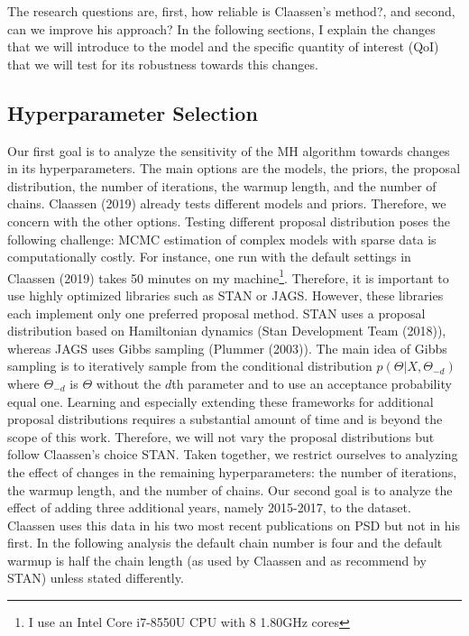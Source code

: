 \documentclass[12pt,english,a4paper,oneside]{article}
\theoremstyle{definition}
\theoremstyle{definition}
\theoremstyle{definition}
\theoremstyle{definition}
\theoremstyle{remark}
\begin{document}
The research questions are, first, how reliable is Claassen's method?, and second, can we improve his approach? In the following sections, I explain the changes that we will introduce to the model and the specific quantity of interest (QoI) that we will test for its robustness towards this changes.

\hypertarget{hyperparameter-selection}{%
\subsection{Hyperparameter Selection}\label{hyperparameter-selection}}

Our first goal is to analyze the sensitivity of the MH algorithm towards changes in its hyperparameters. The main options are the models, the priors, the proposal distribution, the number of iterations, the warmup length, and the number of chains. Claassen (2019) already tests different models and priors. Therefore, we concern with the other options. Testing different proposal distribution poses the following challenge: MCMC estimation of complex models with sparse data is computationally costly. For instance, one run with the default settings in Claassen (2019) takes 50 minutes on my machine\footnote{I use an Intel Core i7-8550U CPU with 8 1.80GHz cores}. Therefore, it is important to use highly optimized libraries such as STAN or JAGS. However, these libraries each implement only one preferred proposal method. STAN uses a proposal distribution based on Hamiltonian dynamics (Stan Development Team (2018)), whereas JAGS uses Gibbs sampling (Plummer (2003)). The main idea of Gibbs sampling is to iteratively sample from the conditional distribution \(p(\Theta|X, \Theta_{-d})\) where \(\Theta_{-d}\) is \(\Theta\) without the \(d\)th parameter and to use an acceptance probability equal one. Learning and especially extending these frameworks for additional proposal distributions requires a substantial amount of time and is beyond the scope of this work. Therefore, we will not vary the proposal distributions but follow Claassen's choice STAN. Taken together, we restrict ourselves to analyzing the effect of changes in the remaining hyperparameters: the number of iterations, the warmup length, and the number of chains. Our second goal is to analyze the effect of adding three additional years, namely 2015-2017, to the dataset. Claassen uses this data in his two most recent publications on PSD but not in his first. In the following analysis the default chain number is four and the default warmup is half the chain length (as used by Claassen and as recommend by STAN) unless stated differently.
\end{document}
